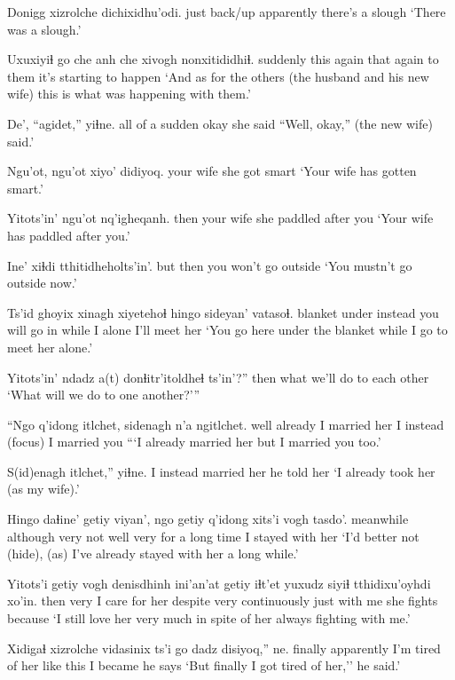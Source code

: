 \documentclass[12pt]{article}
\begin{document}
\gll Donigg xizrolche dichixidhu'odi. 
{just back/up} apparently {there's a slough}
\glt `There was a slough.' 
\glend

\gll Uxuxiyiɬ go che anh che xivogh nonxitididhiɬ.
suddenly this again that again {to them} {it's starting to happen}
\glt `And as for the others (the husband and his new wife) this is what was happening with them.' 
\glend

\gll De', ``agidet,'' yiɬne. 
{all of a sudden} okay {she said}
\glt ``Well, okay,'' (the new wife) said.' 
\glend

\gll Ngu'ot, ngu'ot {xiyo' didiyoq.}
{your wife} {}  {she got smart}
\glt `Your wife has gotten smart.' 
\glend

\gll Yitots'in' ngu'ot nq'igheqanh. 
then   {your wife} {she paddled after you}
\glt `Your wife has paddled after you.' 
\glend

\gll Ine' xiɬdi {tthitidheholts'in'}. 
but then {you won't go outside}
\glt `You mustn't go outside now.' 
\glend

\gll Ts'id ghoyix xinagh xiyetehoɬ hingo sideyan' vatasoɬ. 
blanket under instead {you will go in} while {I alone} {I'll meet her}
\glt `You go here under the blanket while I go to meet her alone.' 
\glend

\gll Yitots'in' ndadz a(t) donɬitr'itoldheɬ ts'in'?''
then  what {} {we'll do to each other}
\glt `What will we do to one another?''' 
\glend

\gll ``Ngo q'idong itlchet, sidenagh n'a ngitlchet. 
well already {I married her} {I instead} {(focus)} {I married you}
\glt ```I already married her but I married you too.' 
\glend

\gll S(id)enagh itlchet,'' yiɬne. 
{I instead} {married her} {he told her}
\glt `I already took her (as my wife).'
\glend

\gll Hingo daɬine' getiy viyan', ngo getiy {q'idong xits'i} {vogh tasdo'}. 
meanwhile although very not well very {for a long time} {I stayed with her}
\glt `I'd better not (hide), (as) I've already stayed with her a long while.' 
\glend

\gll Yitots'i getiy {vogh denisdhinh} ini'an'at getiy iɬt'et yuxudz siyiɬ tthidixu'oyhdi xo'in. 
then very  {I care for her} despite very continuously just {with me} {she fights} because
\glt `I still love her very much in spite of her always fighting with me.' 
\glend

\gll Xidigaɬ xizrolche vidasinix ts'i {go dadz} disiyoq,'' ne. 
finally {apparently} {I'm tired of her} {} {like this} {I became} {he says}
\glt `But finally I got tired of her,'' he said.' 
\glend
\end{document}
